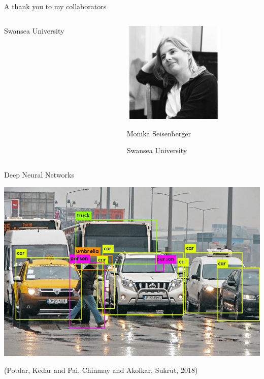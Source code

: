 \documentclass[smaller]{beamer}
\begin{document}
\begin{frame}[label={sec:org50a9592}]{A thank you to my collaborators}
\begin{columns}
\begin{column}{0.3\columnwidth}
\begin{center}
Swansea University
\end{center}
\end{column}
\begin{column}{0.3\columnwidth}
\begin{center}
\includegraphics[width=0.7\textwidth]{images/Monika-Seisenberger.jpg}
\end{center}
\begin{center}
Monika Seisenberger

Swansea University
\end{center}
\end{column}
\end{columns}
\end{frame}

\begin{frame}[label={sec:org7657efc}]{Deep Neural Networks}
\begin{center}
\includegraphics[width=.9\linewidth]{images/Object-detection-in-a-dense-scene.jpg}
\end{center}
(Potdar, Kedar and Pai, Chinmay and Akolkar, Sukrut, 2018)
\end{frame}
\end{document}
